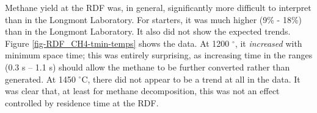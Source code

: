 \documentclass[11pt,twocolumn]{article}
\begin{document}


Methane yield at the RDF was, in general, significantly more difficult to interpret than in the Longmont Laboratory.  For starters, it was much higher (9\% - 18\%) than in the Longmont Laboratory.  It also did not show the expected trends.  Figure \ref{fig-RDF_CH4-tmin-temps} shows the data.  At 1200 $^{\circ}$, it \emph{increased} with minimum space time; this was entirely surprising, as increasing time in the ranges (0.3 s -- 1.1 s) should allow the methane to be further converted rather than generated.  At 1450 $^{\circ}$C, there did not appear to be a trend at all in the data.  It was clear that, at least for methane decomposition, this was not an effect controlled by residence time at the RDF.
\end{document}
